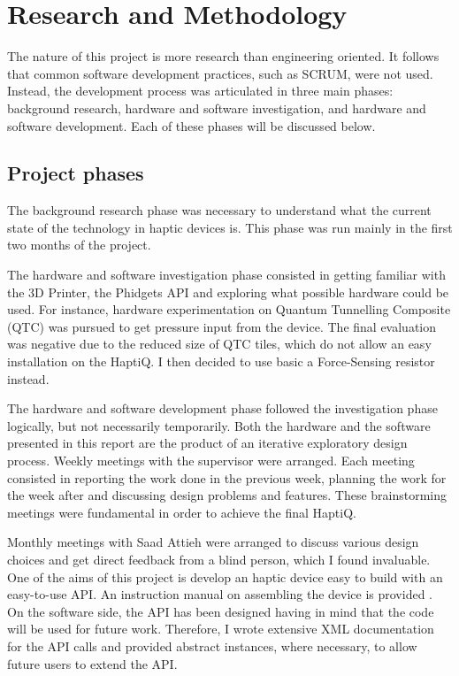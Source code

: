 \chapter{Research and Methodology}

The nature of this project is more research than engineering oriented. It follows that common software development practices, such as SCRUM, were not used. Instead, the development process was articulated in three main phases: background research, hardware and software investigation, and hardware and software development. Each of these phases will be discussed below. 

\section{Project phases}
The background research phase was necessary to understand what the current state of the technology in haptic devices is. This phase was run mainly in the first two months of the project. 

The hardware and software investigation phase consisted in getting familiar with the 3D Printer, the Phidgets API and exploring what possible hardware could be used. For instance, hardware experimentation on Quantum Tunnelling Composite (QTC) was pursued to get pressure input from the device. The final evaluation was negative due to the reduced size of QTC tiles, which do not allow an easy installation on the HaptiQ. I then decided to use basic a Force-Sensing resistor instead. 

The hardware and software development phase followed the investigation phase logically, but not necessarily temporarily. Both the hardware and the software presented in this report are the product of an iterative exploratory design process. Weekly meetings with the supervisor were arranged. Each meeting consisted in reporting the work done in the previous week, planning the work for the week after and discussing design problems and features. These brainstorming meetings were fundamental in order to achieve the final HaptiQ.

Monthly meetings with Saad Attieh were arranged to discuss various design choices and get direct feedback from a blind person, which I found invaluable. 
One of the aims of this project is develop an haptic device easy to build with an easy-to-use API. An instruction manual on assembling the device is provided . On the software side, the API has been designed having in mind that the code will be used for future work. Therefore, I wrote extensive XML documentation for the API calls and provided abstract instances, where necessary, to allow future users to extend the API. 

